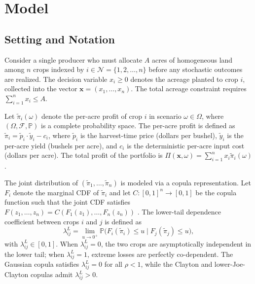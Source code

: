 \documentclass[12pt,review,authoryear]{elsarticle}
\numberwithin{equation}{section}
\begin{document}
\section{Model}
\label{sec:model}

\subsection{Setting and Notation}

Consider a single producer who must allocate $A$ acres of homogeneous
land among $n$ crops indexed by $i \in \mathcal{N} = \{1, 2, \ldots, n\}$
before any stochastic outcomes are realized.  The decision variable
$x_i \geq 0$ denotes the acreage planted to crop $i$, collected into the
vector $\mathbf{x} = (x_1, \ldots, x_n)$.  The total acreage constraint
requires $\sum_{i=1}^{n} x_i \leq A$.

Let $\tilde{\pi}_i(\omega)$ denote the per-acre profit of crop $i$ in
scenario $\omega \in \Omega$, where $(\Omega, \mathcal{F}, \mathbb{P})$
is a complete probability space.  The per-acre profit is defined as
$\tilde{\pi}_i = \tilde{p}_i \cdot \tilde{y}_i - c_i$, where
$\tilde{p}_i$ is the harvest-time price (dollars per bushel),
$\tilde{y}_i$ is the per-acre yield (bushels per acre), and $c_i$ is the
deterministic per-acre input cost (dollars per acre).  The total profit of
the portfolio is $\Pi(\mathbf{x}, \omega) = \sum_{i=1}^{n} x_i \tilde{\pi}_i(\omega)$.

The joint distribution of $(\tilde{\pi}_1, \ldots, \tilde{\pi}_n)$ is
modeled via a copula representation.  Let $F_i$ denote the marginal CDF
of $\tilde{\pi}_i$ and let $C: [0,1]^n \to [0,1]$ be the copula function
such that the joint CDF satisfies $F(z_1, \ldots, z_n) = C(F_1(z_1), \ldots, F_n(z_n))$
\citep{Sklar1959}.  The lower-tail dependence coefficient between crops
$i$ and $j$ is defined as
\begin{equation}
\lambda_{ij}^{L} = \lim_{u \to 0^{+}} \mathbb{P}
\bigl( F_i(\tilde{\pi}_i) \leq u \mid F_j(\tilde{\pi}_j) \leq u \bigr),
\label{eq:ltd}
\end{equation}
with $\lambda_{ij}^{L} \in [0,1]$.  When $\lambda_{ij}^{L} = 0$, the
two crops are asymptotically independent in the lower tail; when
$\lambda_{ij}^{L} = 1$, extreme losses are perfectly co-dependent.  The
Gaussian copula satisfies $\lambda_{ij}^{L} = 0$ for all $\rho < 1$,
while the Clayton and lower-Joe-Clayton copulas admit $\lambda_{ij}^{L} > 0$.
\end{document}
